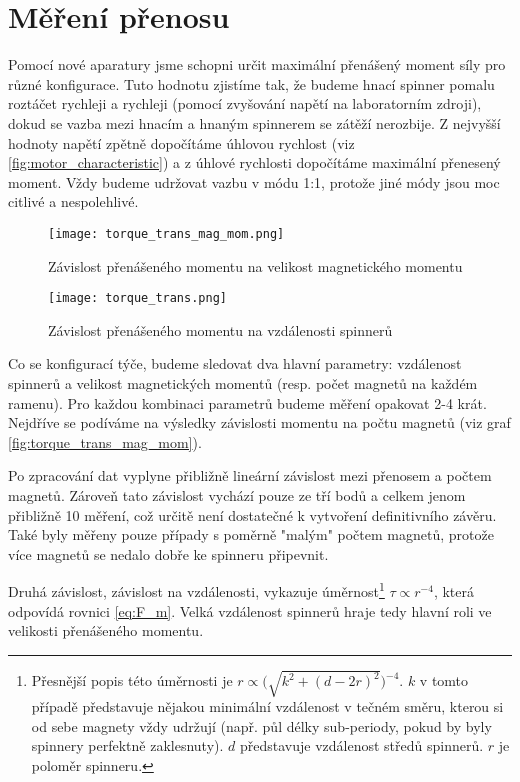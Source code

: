 \clearpage

\section{Měření přenosu}

Pomocí nové aparatury jsme schopni určit maximální přenášený moment síly pro různé konfigurace. Tuto hodnotu zjistíme tak, že budeme hnací spinner pomalu roztáčet rychleji a rychleji (pomocí zvyšování napětí na laboratorním zdroji), dokud se vazba mezi hnacím a hnaným spinnerem se zátěží nerozbije. Z nejvyšší hodnoty napětí zpětně dopočítáme úhlovou rychlost (viz \autoref{fig:motor_characteristic}) a z úhlové rychlosti dopočítáme maximální přenesený moment. Vždy budeme udržovat vazbu v módu 1:1, protože jiné módy jsou moc citlivé a nespolehlivé.

\begin{wrapfigure}{r}{0.5\textwidth}
    \vspace{-1cm}
    \texttt{[image: torque\_trans\_mag\_mom.png]}
    \centering
    \caption{Závislost přenášeného momentu na velikost magnetického momentu}
    \label{fig:torque_trans_mag_mom}

    \vspace{1cm}
    \texttt{[image: torque\_trans.png]}
    \centering
    \caption{Závislost přenášeného momentu na vzdálenosti spinnerů}
    \label{fig:torque_trans}
\end{wrapfigure}

Co se konfigurací týče, budeme sledovat dva hlavní parametry: vzdálenost spinnerů a velikost magnetických momentů (resp. počet magnetů na každém ramenu). Pro každou kombinaci parametrů budeme měření opakovat 2-4 krát. Nejdříve se podíváme na výsledky závislosti momentu na počtu magnetů (viz graf \ref{fig:torque_trans_mag_mom}).

Po zpracování dat vyplyne přibližně lineární závislost mezi přenosem a počtem magnetů. Zároveň tato závislost vychází pouze ze tří bodů a celkem jenom přibližně 10 měření, což určitě není dostatečné k vytvoření definitivního závěru. Také byly měřeny pouze případy s poměrně "malým" počtem magnetů, protože více magnetů se nedalo dobře ke spinneru připevnit.

Druhá závislost, závislost na vzdálenosti, vykazuje úměrnost\footnote{Přesnější popis této úměrnosti je $r \propto \big( \sqrt{k^2+(d-2r)^2} \big)^{-4}$. $k$ v tomto případě představuje nějakou minimální vzdálenost v tečném směru, kterou si od sebe magnety vždy udržují (např. půl délky sub-periody, pokud by byly spinnery perfektně zaklesnuty). $d$ představuje vzdálenost středů spinnerů. $r$ je poloměr spinneru. } $\tau \propto r^{-4}$, která odpovídá rovnici \ref{eq:F_m}. Velká vzdálenost spinnerů hraje tedy hlavní roli ve velikosti přenášeného momentu.

\clearpage